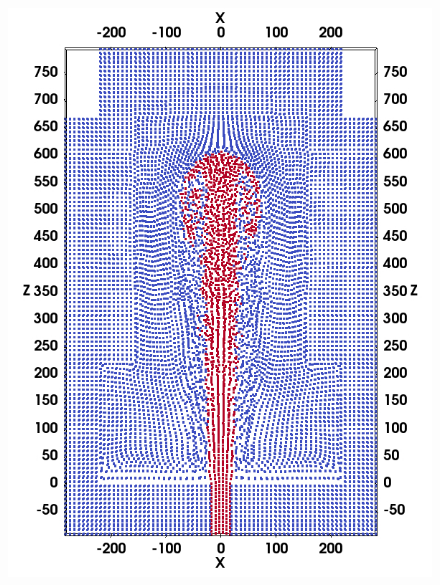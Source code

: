 \documentclass[review]{elsarticle}
\begin{document}
\begin{figure}[H]
\begin{minipage}[t]{.325\textwidth}
    \end{minipage}%
    \\
    \centering
    \begin{minipage}[t]{.325 \textwidth}
        \centering
        \includegraphics[width=0.99 \textwidth]{./Figures/GSPH-HLLC-t3-cutView}
    \end{minipage}%
    \begin{minipage}[t]{.325\textwidth}
        \centering

\end{minipage}
\end{figure}
\end{document}
